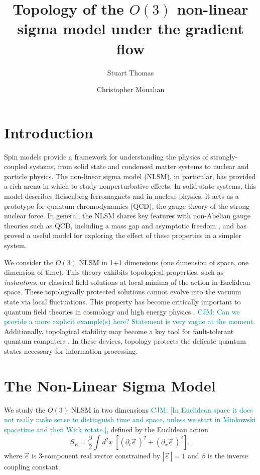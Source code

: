 \documentclass[a4paper,11pt]{article}
\title{Topology of the $O(3)$ non-linear sigma model under the gradient flow}
\author*[a]{Stuart Thomas}
\author[a,b]{Christopher Monahan}
\affiliation[a]{Department of Physics, William \& Mary,  Williamsburg, Virginia 23187, USA}
\affiliation[b]{Thomas Jefferson National Accelerator Facility, Newport News, Virginia, USA}
\newcommand{\e}{\vec e}
\newcommand\chris[1]{\textcolor{teal}{CJM: #1}}
\begin{document}
\maketitle


\section{Introduction}

Spin models provide a framework for understanding the physics of strongly-coupled systems, from solid state and condensed matter systems to nuclear and particle physics. The non-linear sigma model (NLSM), in particular, has provided a rich arena in which to study nonperturbative effects. In solid-state systems, this model describes Heisenberg ferromagnets \cite{callan1985} and in nuclear physics, it acts as a prototype for quantum chromodynamics (QCD), the gauge theory of the strong nuclear force. In general, the NLSM shares key features with non-Abelian gauge theories such as QCD, including a mass gap and asymptotic freedom \cite{polyakov1975}, and has proved a useful model for exploring the effect of these properties in a simpler system.

We consider the $O(3)$ NLSM in 1+1 dimensions (one dimension of space, one dimension of time). This theory exhibits topological properties, such as \textit{instantons}, or classical field solutions at local minima of the action in Euclidean space. These topologically protected solutions cannot evolve into the vacuum state via local fluctuations. This property has become critically important to quantum field theories in cosmology and high energy physics \cite{goddard1986}. \chris{Can we provide a more explicit example(s) here? Statement is very vague at the moment.} Additionally, topological stability may become a key tool for fault-tolerant quantum computers \cite{kitaev1997}. In these devices, topology protects the delicate quantum states necessary for information processing.


\section{The Non-Linear Sigma Model}

We study the $O(3)$ NLSM in two dimensions \chris{[In Euclidean space it does not really make sense to distinguish time and space, unless we start in Minkowski spacetime and then Wick rotate.]}, defined by the Euclidean action
\begin{equation*}
    \label{eq:nlsm euclidean action}
    S_E = \frac{\beta}{2} \int d^2x \; \left[ \left(\partial_t \e\, \right)^2+ \left( \partial_x \e\,\right)^2 \right],
\end{equation*}
where $\e$ is 3-component real vector constrained by $|\e\,|=1$ and $\beta$ is the inverse coupling constant. 
\end{document}
